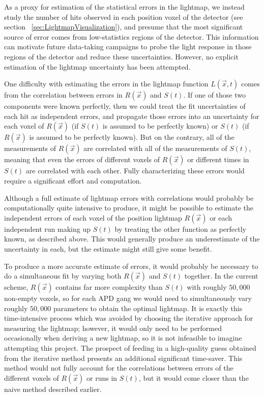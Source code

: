 As a proxy for estimation of the statistical errors in the lightmap, we instead study the number of hits observed in each position voxel of the detector (see section ~\ref{sec:LightmapVisualization}), and presume that the most significant source of error comes from low-statistics regions of the detector.  This information can motivate future data-taking campaigns to probe the light response in those regions of the detector and reduce these uncertainties.  However, no explicit estimation of the lightmap uncertainty has been attempted.

One difficulty with estimating the errors in the lightmap function $L(\vec{x},t)$ comes from the correlation between errors in $R(\vec{x})$ and $S(t)$.  If one of those two components were known perfectly, then we could treat the fit uncertainties of each hit as independent errors, and propagate those errors into an uncertainty for each voxel of $R(\vec{x})$ (if $S(t)$ is assumed to be perfectly known) or $S(t)$ (if $R(\vec{x})$ is assumed to be perfectly known).  But on the contrary, all of the measurements of $R(\vec{x})$ are correlated with all of the measurements of $S(t)$, meaning that even the errors of different voxels of $R(\vec{x})$ or different times in $S(t)$ are correlated with each other.  Fully characterizing these errors would require a significant effort and computation.

Although a full estimate of lightmap errors with correlations would probably be computationally quite intensive to produce, it might be possible to estimate the independent errors of each voxel of the position lightmap $R(\vec{x})$ or each independent run making up $S(t)$ by treating the other function as perfectly known, as described above.  This would generally produce an underestimate of the uncertainty in each, but the estimate might still give some benefit.

To produce a more accurate estimate of errors, it would probably be necessary to do a simultaneous fit by varying both $R(\vec{x})$ and $S(t)$ together.  In the current scheme, $R(\vec{x})$ contains far more complexity than $S(t)$ with roughly $50,000$ non-empty voxels, so for each APD gang we would need to simultaneously vary roughly $50,000$ parameters to obtain the optimal lightmap.  It is exactly this time-intensive process which was avoided by choosing the iterative approach for measuring the lightmap; however, it would only need to be performed occasionally when deriving a new lightmap, so it is not infeasible to imagine attempting this project.  The prospect of feeding in a high-quality guess obtained from the iterative method presents an additional significant time-saver.  This method would not fully account for the correlations between errors of the different voxels of $R(\vec{x})$ or runs in $S(t)$, but it would come closer than the naive method described earlier.

